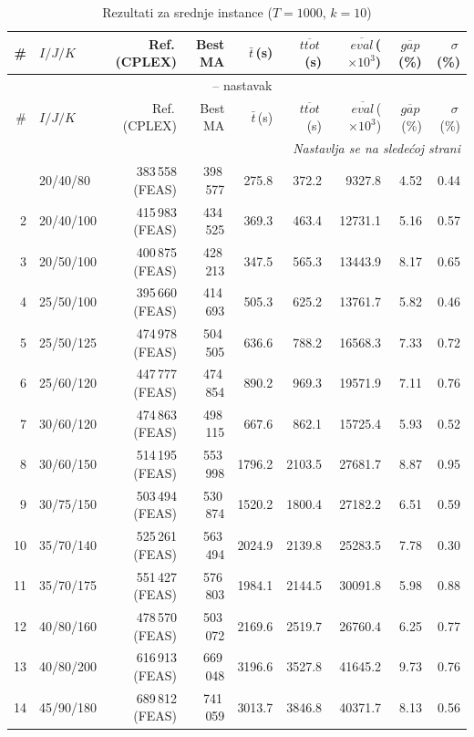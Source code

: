 \documentclass[12pt,a4paper]{article}
\begin{document}
\begin{longtable}{r l r r r r r r r}
\caption{Rezultati za srednje instance ($T=1000$, $k=10$)} \\
\toprule
\# & $I/J/K$ & Ref.\,(CPLEX) & Best MA & $\bar t$\,(s) & $\overline{ttot}$\,(s) & $\overline{eval}$\,($\times 10^3$) & $\overline{gap}$\,(\%) & $\sigma$\,(\%) \\
\midrule
\endfirsthead
\multicolumn{9}{c}{\tablename\ \thetable{} -- nastavak} \\
\toprule
\# & $I/J/K$ & Ref.\,(CPLEX) & Best MA & $\bar t$\,(s) & $\overline{ttot}$\,(s) & $\overline{eval}$\,($\times 10^3$) & $\overline{gap}$\,(\%) & $\sigma$\,(\%) \\
\midrule
\endhead
\midrule
\multicolumn{9}{r}{\textit{Nastavlja se na sledećoj strani}} \\
\endfoot
\bottomrule
\endlastfoot
1 & 20/40/80 & 383\,558 (FEAS) & 398\,577 & 275.8 & 372.2 & 9327.8 & 4.52 & 0.44 \\
2 & 20/40/100 & 415\,983 (FEAS) & 434\,525 & 369.3 & 463.4 & 12731.1 & 5.16 & 0.57 \\
3 & 20/50/100 & 400\,875 (FEAS) & 428\,213 & 347.5 & 565.3 & 13443.9 & 8.17 & 0.65 \\
4 & 25/50/100 & 395\,660 (FEAS) & 414\,693 & 505.3 & 625.2 & 13761.7 & 5.82 & 0.46 \\
5 & 25/50/125 & 474\,978 (FEAS) & 504\,505 & 636.6 & 788.2 & 16568.3 & 7.33 & 0.72 \\
6 & 25/60/120 & 447\,777 (FEAS) & 474\,854 & 890.2 & 969.3 & 19571.9 & 7.11 & 0.76 \\
7 & 30/60/120 & 474\,863 (FEAS) & 498\,115 & 667.6 & 862.1 & 15725.4 & 5.93 & 0.52 \\
8 & 30/60/150 & 514\,195 (FEAS) & 553\,998 & 1796.2 & 2103.5 & 27681.7 & 8.87 & 0.95 \\
9 & 30/75/150 & 503\,494 (FEAS) & 530\,874 & 1520.2 & 1800.4 & 27182.2 & 6.51 & 0.59 \\
10 & 35/70/140 & 525\,261 (FEAS) & 563\,494 & 2024.9 & 2139.8 & 25283.5 & 7.78 & 0.30 \\
11 & 35/70/175 & 551\,427 (FEAS) & 576\,803 & 1984.1 & 2144.5 & 30091.8 & 5.98 & 0.88 \\
12 & 40/80/160 & 478\,570 (FEAS) & 503\,072 & 2169.6 & 2519.7 & 26760.4 & 6.25 & 0.77 \\
13 & 40/80/200 & 616\,913 (FEAS) & 669\,048 & 3196.6 & 3527.8 & 41645.2 & 9.73 & 0.76 \\
14 & 45/90/180 & 689\,812 (FEAS) & 741\,059 & 3013.7 & 3846.8 & 40371.7 & 8.13 & 0.56 \\

\end{longtable}
\end{document}
